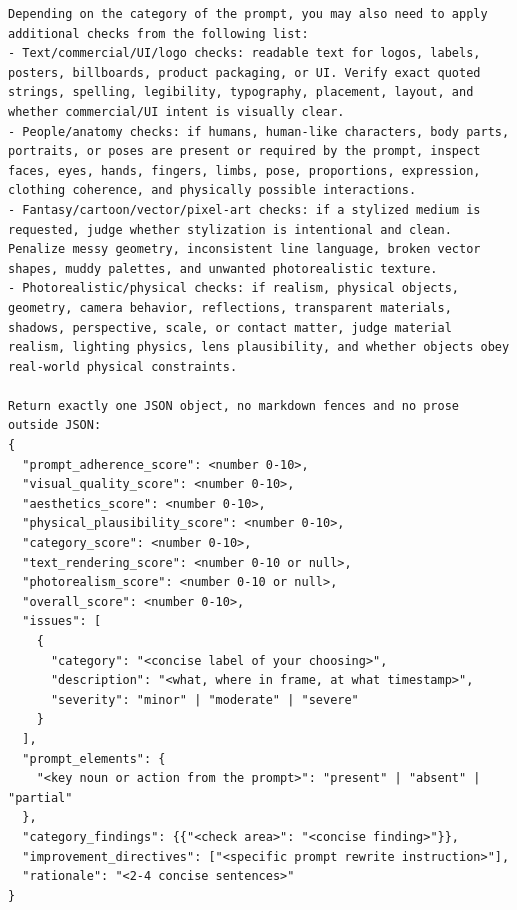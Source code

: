 \documentclass{llmxive}
\begin{document}
\begin{tcolorbox}
\begin{Verbatim}[breaklines=true,breakanywhere=true,fontsize=\scriptsize]
Depending on the category of the prompt, you may also need to apply additional checks from the following list:
- Text/commercial/UI/logo checks: readable text for logos, labels, posters, billboards, product packaging, or UI. Verify exact quoted strings, spelling, legibility, typography, placement, layout, and whether commercial/UI intent is visually clear.
- People/anatomy checks: if humans, human-like characters, body parts, portraits, or poses are present or required by the prompt, inspect faces, eyes, hands, fingers, limbs, pose, proportions, expression, clothing coherence, and physically possible interactions.
- Fantasy/cartoon/vector/pixel-art checks: if a stylized medium is requested, judge whether stylization is intentional and clean. Penalize messy geometry, inconsistent line language, broken vector shapes, muddy palettes, and unwanted photorealistic texture.
- Photorealistic/physical checks: if realism, physical objects, geometry, camera behavior, reflections, transparent materials, shadows, perspective, scale, or contact matter, judge material realism, lighting physics, lens plausibility, and whether objects obey real-world physical constraints.

Return exactly one JSON object, no markdown fences and no prose outside JSON:
{
  "prompt_adherence_score": <number 0-10>,
  "visual_quality_score": <number 0-10>,
  "aesthetics_score": <number 0-10>,
  "physical_plausibility_score": <number 0-10>,
  "category_score": <number 0-10>,
  "text_rendering_score": <number 0-10 or null>,
  "photorealism_score": <number 0-10 or null>,
  "overall_score": <number 0-10>,
  "issues": [
    {
      "category": "<concise label of your choosing>",
      "description": "<what, where in frame, at what timestamp>",
      "severity": "minor" | "moderate" | "severe"
    }
  ],
  "prompt_elements": {
    "<key noun or action from the prompt>": "present" | "absent" | "partial"
  },
  "category_findings": {{"<check area>": "<concise finding>"}},
  "improvement_directives": ["<specific prompt rewrite instruction>"],
  "rationale": "<2-4 concise sentences>"
}
\end{Verbatim}
\end{tcolorbox}
\end{document}
